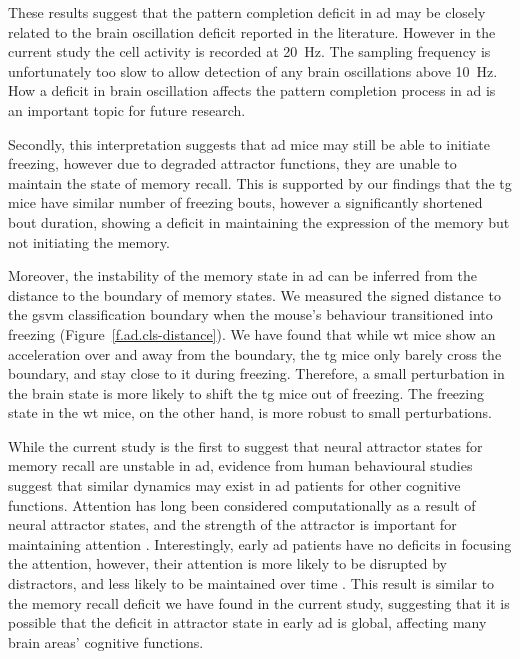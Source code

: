 These results suggest that the pattern completion deficit in \gls{ad} may be closely related to the brain oscillation deficit reported in the literature. However in the current study the cell activity is recorded at \SI{20}{\hertz}. The sampling frequency is unfortunately too slow to allow detection of any brain oscillations above \SI{10}{\hertz}. How a deficit in brain oscillation affects the pattern completion process in \gls{ad} is an important topic for future research. 

Secondly, this interpretation suggests that \gls{ad} mice may still be able to initiate freezing, however due to degraded attractor functions, they are unable to maintain the state of memory recall. This is supported by our findings that the \gls{tg} mice have similar number of freezing bouts, however a significantly shortened bout duration, showing a deficit in maintaining the expression of the memory but not initiating the memory. 

Moreover, the instability of the memory state in \gls{ad} can be inferred from the distance to the boundary of memory states. We measured the signed distance to the \gls{gsvm} classification boundary when the mouse's behaviour transitioned into freezing (Figure~\ref{f.ad.cls-distance}). We have found that while \gls{wt} mice show an acceleration over and away from the boundary, the \gls{tg} mice only barely cross the boundary, and stay close to it during freezing. Therefore, a small perturbation in the brain state is more likely to shift the \gls{tg} mice out of freezing. The freezing state in the \gls{wt} mice, on the other hand, is more robust to small perturbations.  

While the current study is the first to suggest that neural attractor states for memory recall are unstable in \gls{ad}, evidence from human behavioural studies suggest that similar dynamics may exist in \gls{ad} patients for other cognitive functions. Attention has long been considered computationally as a result of neural attractor states, and the strength of the attractor is important for maintaining attention \citep{desimone95, rolls08a, rolls13a}. Interestingly, early \gls{ad} patients have no deficits in focusing the attention, however, their attention is more likely to be disrupted by distractors, and less likely to be maintained over time \citep{perry99}. This result is similar to the memory recall deficit we have found in the current study, suggesting that it is possible that the deficit in attractor state in early \gls{ad} is global, affecting many brain areas' cognitive functions. 

